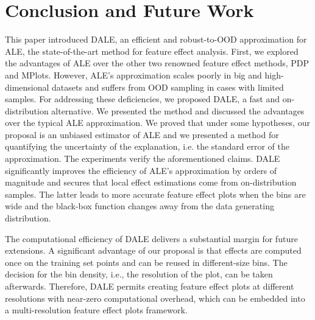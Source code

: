 \documentclass[wcp]{jmlr}
\begin{document}
\section{Conclusion and Future Work}
This paper introduced DALE, an efficient and robust-to-OOD
approximation for ALE, the state-of-the-art method for feature effect
analysis. First, we explored the advantages of ALE over the other two
renowned feature effect methods, PDP and MPlots. However, ALE's
approximation scales poorly in big and high-dimensional datasets and
suffers from OOD sampling in cases with limited samples. For
addressing these deficiencies, we proposed DALE, a fast and
on-distribution alternative. We presented the method and discussed the
advantages over the typical ALE approximation. We proved that under
some hypotheses, our proposal is an unbiased estimator of ALE and we
presented a method for quantifying the uncertainty of the explanation,
i.e. the standard error of the approximation. The experiments verify
the aforementioned claims. DALE significantly improves the efficiency
of ALE's approximation by orders of magnitude and secures that local
effect estimations come from on-distribution samples. The latter leads
to more accurate feature effect plots when the bins are wide and the
black-box function changes away from the data generating distribution.

The computational efficiency of DALE delivers a substantial margin for
future extensions. A significant advantage of our proposal is that
effects are computed once on the training set points and can be reused
in different-size bins. The decision for the bin density, i.e., the
resolution of the plot, can be taken afterwards. Therefore, DALE
permits creating feature effect plots at different resolutions with
near-zero computational overhead, which can be embedded into a
multi-resolution feature effect plots framework.


%


\end{document}

